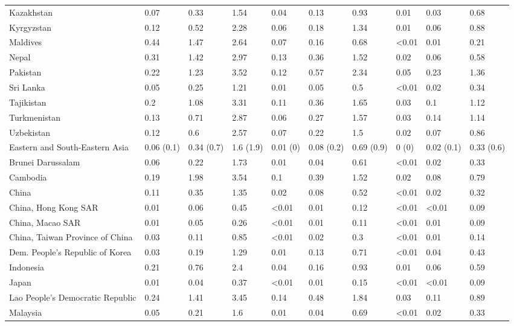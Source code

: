 \begin{longtable}[t]{llllllllll}
Kazakhstan & 0.07 & 0.33 & 1.54 & 0.04 & 0.13 & 0.93 & 0.01 & 0.03 & 0.68\\
\addlinespace
Kyrgyzstan & 0.12 & 0.52 & 2.28 & 0.06 & 0.18 & 1.34 & 0.01 & 0.06 & 0.88\\
Maldives & 0.44 & 1.47 & 2.64 & 0.07 & 0.16 & 0.68 & <0.01 & 0.01 & 0.21\\
Nepal & 0.31 & 1.42 & 2.97 & 0.13 & 0.36 & 1.52 & 0.02 & 0.06 & 0.58\\
Pakistan & 0.22 & 1.23 & 3.52 & 0.12 & 0.57 & 2.34 & 0.05 & 0.23 & 1.36\\
Sri Lanka & 0.05 & 0.25 & 1.21 & 0.01 & 0.05 & 0.5 & <0.01 & 0.02 & 0.34\\
\addlinespace
Tajikistan & 0.2 & 1.08 & 3.31 & 0.11 & 0.36 & 1.65 & 0.03 & 0.1 & 1.12\\
Turkmenistan & 0.13 & 0.71 & 2.87 & 0.06 & 0.27 & 1.57 & 0.03 & 0.14 & 1.14\\
Uzbekistan & 0.12 & 0.6 & 2.57 & 0.07 & 0.22 & 1.5 & 0.02 & 0.07 & 0.86\\
Eastern and South-Eastern Asia & 0.06 (0.1) & 0.34 (0.7) & 1.6 (1.9) & 0.01 (0) & 0.08 (0.2) & 0.69 (0.9) & 0 (0) & 0.02 (0.1) & 0.33 (0.6)\\
Brunei Darussalam & 0.06 & 0.22 & 1.73 & 0.01 & 0.04 & 0.61 & <0.01 & 0.02 & 0.33\\
\addlinespace
Cambodia & 0.19 & 1.98 & 3.54 & 0.1 & 0.39 & 1.52 & 0.02 & 0.08 & 0.79\\
China & 0.11 & 0.35 & 1.35 & 0.02 & 0.08 & 0.52 & <0.01 & 0.02 & 0.32\\
China, Hong Kong SAR & 0.01 & 0.06 & 0.45 & <0.01 & 0.01 & 0.12 & <0.01 & <0.01 & 0.09\\
China, Macao SAR & 0.01 & 0.05 & 0.26 & <0.01 & 0.01 & 0.11 & <0.01 & 0.01 & 0.09\\
China, Taiwan Province of China & 0.03 & 0.11 & 0.85 & <0.01 & 0.02 & 0.3 & <0.01 & 0.01 & 0.14\\
\addlinespace
Dem. People's Republic of Korea & 0.03 & 0.19 & 1.29 & 0.01 & 0.13 & 0.71 & <0.01 & 0.04 & 0.43\\
Indonesia & 0.21 & 0.76 & 2.4 & 0.04 & 0.16 & 0.93 & 0.01 & 0.06 & 0.59\\
Japan & 0.01 & 0.04 & 0.37 & <0.01 & 0.01 & 0.15 & <0.01 & <0.01 & 0.09\\
Lao People's Democratic Republic & 0.24 & 1.41 & 3.45 & 0.14 & 0.48 & 1.84 & 0.03 & 0.11 & 0.89\\
Malaysia & 0.05 & 0.21 & 1.6 & 0.01 & 0.04 & 0.69 & <0.01 & 0.02 & 0.33\\

\end{longtable}
